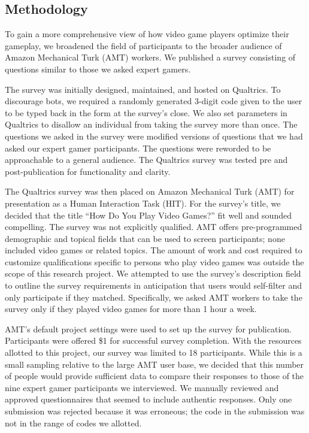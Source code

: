 \documentclass[11pt,manuscript,screen,review]{acmart} %
\begin{document}
\subsection{Methodology}
To gain a more comprehensive view of how video game players optimize their gameplay, we broadened the field of participants to the broader audience of Amazon Mechanical Turk (AMT) workers. We published a survey consisting of questions similar to those we asked expert gamers. 

The survey was initially designed, maintained, and hosted on Qualtrics. To discourage bots, we required a randomly generated 3-digit code given to the user to be typed back in the form at the survey’s close. We also set parameters in Qualtrics to disallow an individual from taking the survey more than once. The questions we asked in the survey were modified versions of questions that we had asked our expert gamer participants. The questions were reworded to be approachable to a general audience. The Qualtrics survey was tested pre and post-publication for functionality and clarity.

The Qualtrics survey was then placed on Amazon Mechanical Turk (AMT) for presentation as a Human Interaction Task (HIT). For the survey’s title, we decided that the title “How Do You Play Video Games?” fit well and sounded compelling. The survey was not explicitly qualified. AMT offers pre-programmed demographic and topical fields that can be used to screen participants; none included video games or related topics. The amount of work and cost required to customize qualifications specific to persons who play video games was outside the scope of this research project. We attempted to use the survey’s description field to outline the survey requirements in anticipation that users would self-filter and only participate if they matched. Specifically, we asked AMT workers to take the survey only if they played video games for more than 1 hour a week. 

AMT’s default project settings were used to set up the survey for publication. Participants were offered \$1 for successful survey completion. With the resources allotted to this project, our survey was limited to 18 participants. While this is a small sampling relative to the large AMT user base, we decided that this number of people would provide sufficient data to compare their responses to those of the nine expert gamer participants we interviewed. We manually reviewed and approved questionnaires that seemed to include authentic responses. Only one submission was rejected because it was erroneous; the code in the submission was not in the range of codes we allotted.
\end{document}
